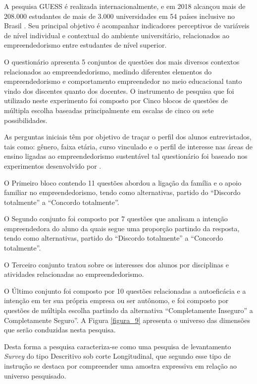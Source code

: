 A pesquisa GUESS é realizada internacionalmente, e em 2018 alcançou mais de 208.000 estudantes de mais de 3.000 universidades em 54 países inclusive no Brasil \cite{sieger_global_2018}.  Seu  principal  objetivo  é  acompanhar  indicadores perceptivos   de   variáveis   de   nível individual   e   contextual   do   ambiente   universitário, relacionados ao empreendedorismo entre estudantes de nível superior.

O questionário apresenta 5 conjuntos de questões dos mais diversos contextos relacionados ao empreendedorismo, medindo diferentes elementos do empreendedorismo e comportamento empreendedor no meio educacional tanto vindo dos discentes quanto dos docentes. O instrumento de pesquisa que foi utilizado neste experimento foi composto por Cinco blocos de questões de múltipla escolha baseadas principalmente em escalas de cinco ou sete possibilidades.

As perguntas iniciais têm por objetivo de traçar o perfil dos alunos entrevistados, tais como: gênero, faixa etária, curso vinculado e o perfil de interesse nas áreas de ensino ligadas ao empreendedorismo sustentável tal questionário foi baseado nos experimentos desenvolvido por . 


O Primeiro bloco contendo 11 questões abordou a ligação da família e o apoio familiar no empreendedorismo, tendo como alternativas, partido do “Discordo totalmente” a “Concordo totalmente”.

O Segundo conjunto foi composto por 7 questões que analisam a intenção empreendedora do aluno da quais segue uma proporção partindo da resposta, tendo como alternativas, partido do “Discordo totalmente” a “Concordo totalmente”.

O Terceiro conjunto tratou sobre os interesses dos alunos por disciplinas e atividades relacionadas ao empreendedorismo.

O Último conjunto foi composto por 10 questões relacionadas a autoeficácia e a intenção em ter sua própria empresa ou ser autônomo, e foi composto por questões de múltipla escolha partindo da alternativa “Completamente Inseguro” a Completamente Seguro”. A Figura \ref{figura_9} apresenta o universo das dimensões que serão conduzidas nesta pesquisa.



Desta forma a pesquisa caracteriza-se como uma pesquisa de levantamento  \textit{Survey} do tipo Descritivo sob corte Longitudinal, que segundo  esse tipo de instrução se destaca por compreender uma amostra expressiva em relação ao universo pesquisado.

